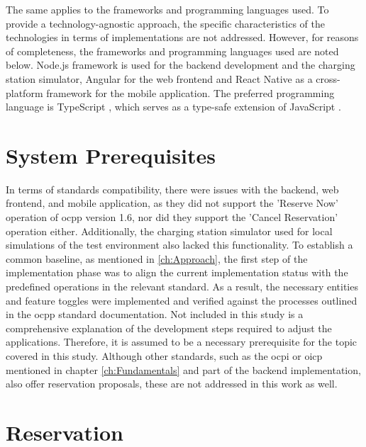 The same applies to the frameworks and programming languages used. To provide a technology-agnostic approach, the specific characteristics of the technologies in terms of implementations are not addressed.
However, for reasons of completeness, the frameworks and programming languages used are noted below. Node.js framework \cite{noauthor_nodejs_nodate} is used for the backend development and the charging station simulator, Angular \cite{noauthor_angular_nodate} for the web frontend and React Native \cite{noauthor_react_nodate} as a cross-platform framework for the mobile application. The preferred programming language is TypeScript \cite{noauthor_javascript_nodate}, which serves as a type-safe extension of JavaScript \cite{noauthor_javascript_2023}.

\section{System Prerequisites}
\label{ch:Implementation:sec:System Prerequisites}

In terms of standards compatibility, there were issues with the backend, web frontend, and mobile application, as they did not support the 'Reserve Now' operation of \acrshort{ocpp} version 1.6, nor did they support the 'Cancel Reservation' operation either.
Additionally, the charging station simulator used for local simulations of the test environment also lacked this functionality.
To establish a common baseline, as mentioned in \ref{ch:Approach}, the first step of the implementation phase was to align the current implementation status with the predefined operations in the relevant standard.
As a result, the necessary entities and feature toggles were implemented and verified against the processes outlined in the \acrfull{ocpp} standard documentation.
Not included in this study is a comprehensive explanation of the development steps required to adjust the applications. Therefore, it is assumed to be a necessary prerequisite for the topic covered in this study.
Although other standards, such as the \acrshort{ocpi} or \acrshort{oicp} mentioned in chapter \ref{ch:Fundamentals} and part of the backend implementation, also offer reservation proposals, these are not addressed in this work as well.

\section{Reservation}
\label{ch:Implementation:sec:Reservation}

